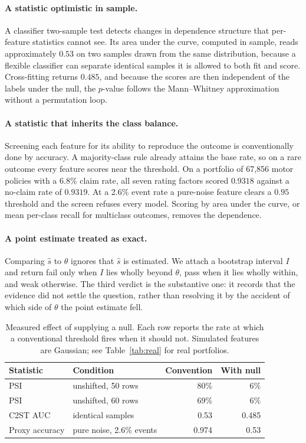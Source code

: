 \documentclass[11pt,a4paper]{article}
\theoremstyle{definition}
\begin{document}
\paragraph{A statistic optimistic in sample.} A classifier two-sample test
\citep{lopezpaz2017} detects changes in dependence structure that per-feature
statistics cannot see. Its area under the curve, computed in sample, reads
approximately $0.53$ on two samples drawn from the same distribution, because a
flexible classifier can separate identical samples it is allowed to both fit
and score. Cross-fitting returns $0.485$, and because the scores are then
independent of the labels under the null, the $p$-value follows the
Mann--Whitney approximation without a permutation loop.

\paragraph{A statistic that inherits the class balance.} Screening each feature
for its ability to reproduce the outcome is conventionally done by accuracy. A
majority-class rule already attains the base rate, so on a rare outcome every
feature scores near the threshold. On a portfolio of 67,856 motor policies with
a 6.8\% claim rate, all seven rating factors scored $0.9318$ against a no-claim
rate of $0.9319$. At a 2.6\% event rate a pure-noise feature clears a $0.95$
threshold and the screen refuses every model. Scoring by area under the curve,
or mean per-class recall for multiclass outcomes, removes the dependence.

\paragraph{A point estimate treated as exact.} Comparing $\hat s$ to $\theta$
ignores that $\hat s$ is estimated. We attach a bootstrap interval $I$ and
return \textup{fail} only when $I$ lies wholly beyond $\theta$,
\textup{pass} when it lies wholly within, and \textup{weak} otherwise. The
third verdict is the substantive one: it records that the evidence did not
settle the question, rather than resolving it by the accident of which side of
$\theta$ the point estimate fell.

\begin{table}[ht]
\centering
\caption{Measured effect of supplying a null. Each row reports the rate at
which a conventional threshold fires when it should not. Simulated features
are Gaussian; see Table~\ref{tab:real} for real portfolios.}
\label{tab:nulls}
\begin{tabular}{llrr}
\toprule
Statistic & Condition & Convention & With null \\
\midrule
PSI            & unshifted, 50 rows        & 80\%   & 6\%   \\
PSI            & unshifted, 60 rows        & 69\%   & 6\%   \\
C2ST AUC       & identical samples         & 0.53   & 0.485 \\
Proxy accuracy & pure noise, 2.6\% events  & 0.974  & 0.53  \\
\bottomrule
\end{tabular}
\end{table}
\end{document}
